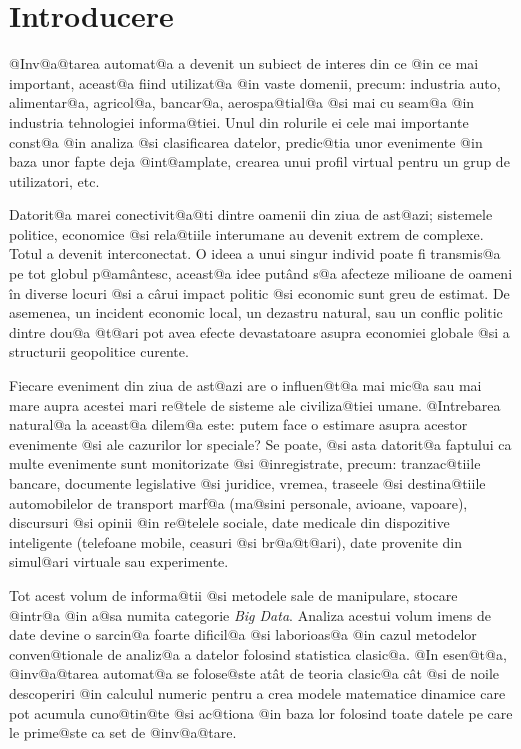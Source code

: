 

\chapter*{Introducere}
\label{capintro}

@Inv@a@tarea automat@a a devenit un subiect de interes din ce @in ce mai important, aceast@a fiind utilizat@a @in vaste domenii, precum: industria auto, alimentar@a, agricol@a, bancar@a, aerospa@tial@a @si mai cu seam@a @in industria tehnologiei informa@tiei. Unul din rolurile ei cele mai importante const@a @in analiza @si clasificarea datelor, predic@tia unor evenimente @in baza unor fapte deja @int@amplate, crearea unui profil virtual pentru un grup de utilizatori, etc.


Datorit@a marei conectivit@a@ti dintre oamenii din ziua de ast@azi; sistemele politice, economice @si rela@tiile interumane au devenit extrem de complexe. Totul a devenit interconectat. O ideea a unui singur individ poate fi transmis@a pe tot globul p@am\^ antesc, aceast@a idee put\^ and s@a afecteze milioane de oameni \^ in diverse locuri @si a c\^ arui impact politic @si economic sunt greu de estimat. De asemenea, un incident economic local, un dezastru natural, sau un conflic politic dintre dou@a @t@ari pot avea efecte devastatoare asupra economiei globale @si a structurii geopolitice curente.

Fiecare eveniment din ziua de ast@azi are o influen@t@a mai mic@a sau mai mare aupra acestei mari re@tele de sisteme ale civiliza@tiei umane. @Intrebarea natural@a la aceast@a dilem@a este: putem face o estimare asupra acestor evenimente @si ale cazurilor lor speciale? Se poate, @si asta datorit@a faptului ca multe evenimente sunt monitorizate @si @inregistrate, precum: tranzac@tiile bancare, documente legislative @si juridice, vremea, traseele @si destina@tiile automobilelor de transport marf@a (ma@sini personale, avioane, vapoare), discursuri @si opinii @in re@telele sociale, date medicale din dispozitive inteligente (telefoane mobile, ceasuri @si br@a@t@ari), date provenite din simul@ari virtuale sau experimente. 

Tot acest volum de informa@tii @si metodele sale de manipulare, stocare @intr@a @in a@sa numita categorie {\sl Big Data}. Analiza acestui volum imens de date devine o sarcin@a foarte dificil@a @si laborioas@a @in cazul metodelor conven@tionale de analiz@a a datelor folosind statistica clasic@a. @In esen@t@a, @inv@a@tarea automat@a se folose@ste at\^ at de teoria clasic@a c\^  at @si de noile descoperiri @in calculul numeric pentru a crea modele matematice dinamice care pot acumula cuno@tin@te @si ac@tiona @in baza lor folosind toate datele pe care le prime@ste ca set de @inv@a@tare.

